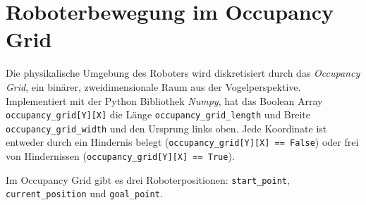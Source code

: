 \chapter{Roboterbewegung im Occupancy Grid}
Die physikalische Umgebung des Roboters wird diskretisiert durch das \textit{Occupancy Grid}, ein binärer, zweidimensionale Raum aus der Vogelperspektive. Implementiert mit der Python Bibliothek \textit{Numpy}, hat das Boolean Array \texttt{occupancy\_grid[Y][X]} die Länge \texttt{occupancy\_grid\_length} und Breite \texttt{occupancy\_grid\_width} und den Ursprung links oben. Jede Koordinate ist entweder durch ein Hindernis belegt (\texttt{occupancy\_grid[Y][X] == False}) oder frei von Hindernissen (\texttt{occupancy\_grid[Y][X] == True}).

Im Occupancy Grid gibt es drei Roboterpositionen: \texttt{start\_point}, \texttt{current\_position} und \texttt{goal\_point}.
